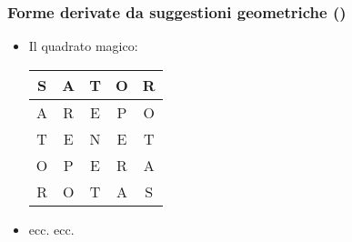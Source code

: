 \begin{frame}
    \frametitle{Forme derivate da suggestioni geometriche ()}

    \begin{itemize}

        \item Il quadrato magico:

            \begin{center}
                \begin{tabular}{|*{5}{c|}}
                  \hline
									S & A & T & O & R\\
                  \hline
									A & R & E & P & O\\
                  \hline
									T & E & N & E & T\\
                  \hline
									O & P & E & R & A\\
                  \hline
									R & O & T & A & S\\
                  \hline
              \end{tabular}
            \end{center}

        \item ecc. ecc.

    \end{itemize}

\end{frame}
